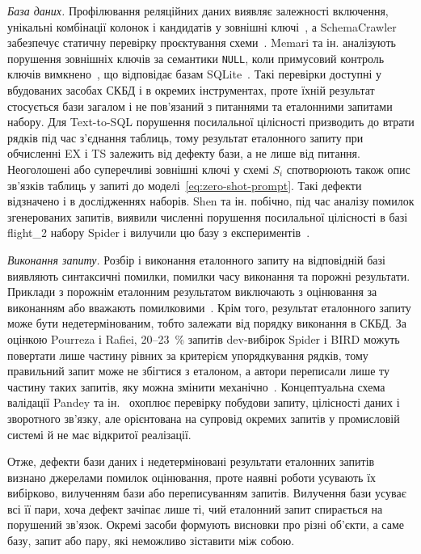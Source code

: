 \documentclass[a4paper,14pt,oneside]{extreport}
\begin{document}
\textit{База даних.}
Профілювання реляційних даних виявляє залежності включення, унікальні комбінації колонок і кандидатів у зовнішні ключі~\cite{abedjan2015profiling}, а SchemaCrawler забезпечує статичну перевірку проєктування схеми~\cite{schemacrawler}. Memari та ін. аналізують порушення зовнішніх ключів за семантики \texttt{NULL}, коли примусовий контроль ключів вимкнено~\cite{memari2015sql}, що відповідає базам SQLite~\cite{sqliteForeignKeys}. Такі перевірки доступні у вбудованих засобах СКБД і в окремих інструментах, проте їхній результат стосується бази загалом і не пов'язаний з питаннями та еталонними запитами набору. Для Text-to-SQL порушення посилальної цілісності призводить до втрати рядків під час з'єднання таблиць, тому результат еталонного запиту при обчисленні EX і TS залежить від дефекту бази, а не лише від питання. Неоголошені або суперечливі зовнішні ключі у схемі \(S_i\) спотворюють також опис зв'язків таблиць у запиті до моделі~\eqref{eq:zero-shot-prompt}. Такі дефекти відзначено і в дослідженнях наборів. Shen та ін. побічно, під час аналізу помилок згенерованих запитів, виявили численні порушення посилальної цілісності в базі flight\_2 набору Spider і вилучили цю базу з експериментів~\cite{shen2026mapledoctor}.

\textit{Виконання запиту.}
Розбір і виконання еталонного запиту на відповідній базі виявляють синтаксичні помилки, помилки часу виконання та порожні результати. Приклади з порожнім еталонним результатом виключають з оцінювання за виконанням або вважають помилковими~\cite{zhong2020testsuites,mitsopoulou2025analysis}. Крім того, результат еталонного запиту може бути недетермінованим, тобто залежати від порядку виконання в СКБД. За оцінкою Pourreza і Rafiei, 20--23~\% запитів dev-вибірок Spider і BIRD можуть повертати лише частину рівних за критерієм упорядкування рядків, тому правильний запит може не збігтися з еталоном, а автори переписали лише ту частину таких запитів, яку можна змінити механічно~\cite{pourreza2023evaluating}. Концептуальна схема валідації Pandey та ін.~\cite{pandey2024validation} охоплює перевірку побудови запиту, цілісності даних і зворотного зв'язку, але орієнтована на супровід окремих запитів у промисловій системі й не має відкритої реалізації.

Отже, дефекти бази даних і недетерміновані результати еталонних запитів визнано джерелами помилок оцінювання, проте наявні роботи усувають їх вибірково, вилученням бази або переписуванням запитів. Вилучення бази усуває всі її пари, хоча дефект зачіпає лише ті, чий еталонний запит спирається на порушений зв'язок. Окремі засоби формують висновки про різні об'єкти, а саме базу, запит або пару, які неможливо зіставити між собою.
\end{document}

